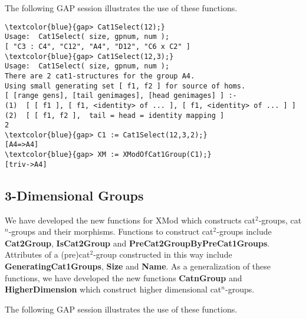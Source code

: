 \documentclass[a4paper,11pt]{article}
\theoremstyle{plain}
\theoremstyle{definition}
\begin{document}
The following \textsf{GAP} session illustrates the use of these functions.

\begin{Verbatim}[frame=single, fontsize=\small, commandchars=\\\{\}]
\textcolor{blue}{gap> Cat1Select(12);}
Usage:  Cat1Select( size, gpnum, num );
[ "C3 : C4", "C12", "A4", "D12", "C6 x C2" ]
\textcolor{blue}{gap> Cat1Select(12,3);}
Usage:  Cat1Select( size, gpnum, num );
There are 2 cat1-structures for the group A4.
Using small generating set [ f1, f2 ] for source of homs.
[ [range gens], [tail genimages], [head genimages] ] :-
(1)  [ [ f1 ], [ f1, <identity> of ... ], [ f1, <identity> of ... ] ]
(2)  [ [ f1, f2 ],  tail = head = identity mapping ]
2
\textcolor{blue}{gap> C1 := Cat1Select(12,3,2);}
[A4=>A4]
\textcolor{blue}{gap> XM := XModOfCat1Group(C1);}
[triv->A4]
\end{Verbatim}

\subsection{3-Dimensional Groups}

We have developed the new functions for \textsf{XMod} which constructs cat$%
^2 $-groups, cat$^n$-groups and their morphisms. Functions to construct cat$%
^{2} $-groups include \textbf{Cat2Group}, \textbf{IsCat2Group} and \textbf{%
	PreCat2GroupByPreCat1Groups}. Attributes of a (pre)cat$^{2}$-group
constructed in this way include \textbf{GeneratingCat1Groups}, \textbf{Size}
and \textbf{Name}. As a generalization of these functions, we have developed
the new functions \textbf{CatnGroup} and \textbf{HigherDimension} which
construct higher dimensional cat$^{n}$-groups.

The following \textsf{GAP} session illustrates the use of these functions.
\end{document}
